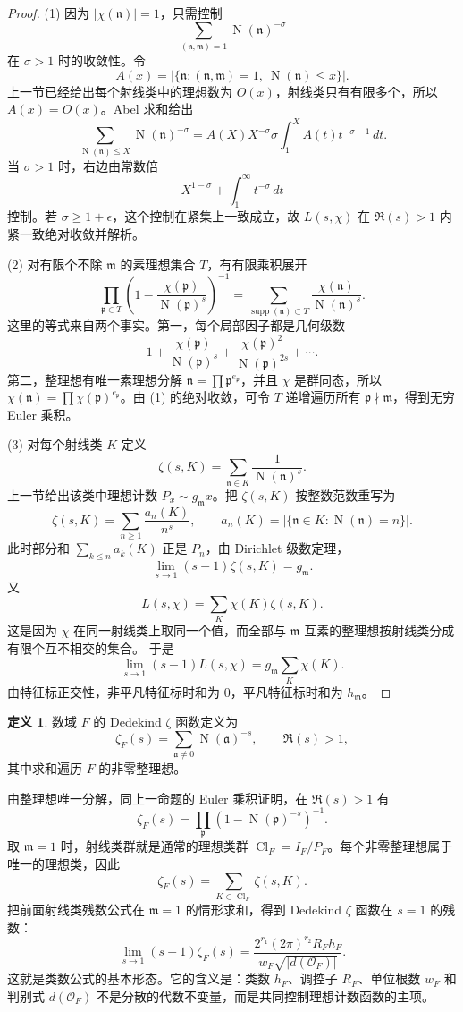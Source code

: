 \documentclass[11pt,a4paper,openany]{ctexbook}
\numberwithin{equation}{chapter}
\newcommand{\OF}{\mathcal{O}_F}
\newcommand{\Nm}{\operatorname{N}}
\theoremstyle{plain}
\theoremstyle{definition}
\newtheorem{definition}[theorem]{定义}
\theoremstyle{remark}
\begin{document}
\begin{proof}
(1) 因为 $|\chi(\mathfrak n)|=1$，只需控制
\[
\sum_{(\mathfrak n,\mathfrak m)=1}\Nm(\mathfrak n)^{-\sigma}
\]
在 $\sigma>1$ 时的收敛性。令
\[
A(x)=|\{\mathfrak n:(\mathfrak n,\mathfrak m)=1,\ \Nm(\mathfrak n)\le x\}|.
\]
上一节已经给出每个射线类中的理想数为 $O(x)$，射线类只有有限多个，所以
$A(x)=O(x)$。Abel 求和给出
\[
\sum_{\Nm(\mathfrak n)\le X}\Nm(\mathfrak n)^{-\sigma}
=A(X)X^{-\sigma}
 \sigma\int_1^X A(t)t^{-\sigma-1}\,dt .
\]
当 $\sigma>1$ 时，右边由常数倍
\[
X^{1-\sigma}+\int_1^\infty t^{-\sigma}\,dt
\]
控制。若 $\sigma\ge1+\epsilon$，这个控制在紧集上一致成立，故 $L(s,\chi)$ 在
$\Re(s)>1$ 内紧一致绝对收敛并解析。

(2) 对有限个不除 $\mathfrak m$ 的素理想集合 $T$，有有限乘积展开
\[
\prod_{\mathfrak p\in T}
\left(1-\frac{\chi(\mathfrak p)}{\Nm(\mathfrak p)^s}\right)^{-1}
=
\sum_{\operatorname{supp}(\mathfrak n)\subset T}
\frac{\chi(\mathfrak n)}{\Nm(\mathfrak n)^s}.
\]
这里的等式来自两个事实。第一，每个局部因子都是几何级数
\[
1+\frac{\chi(\mathfrak p)}{\Nm(\mathfrak p)^s}
+\frac{\chi(\mathfrak p)^2}{\Nm(\mathfrak p)^{2s}}+\cdots .
\]
第二，整理想有唯一素理想分解
\(\mathfrak n=\prod \mathfrak p^{e_{\mathfrak p}}\)，并且 $\chi$ 是群同态，所以
\(\chi(\mathfrak n)=\prod\chi(\mathfrak p)^{e_{\mathfrak p}}\)。由 (1) 的绝对收敛，可令
$T$ 递增遍历所有 $\mathfrak p\nmid\mathfrak m$，得到无穷 Euler 乘积。

(3) 对每个射线类 $K$ 定义
\[
\zeta(s,K)=\sum_{\mathfrak n\in K}\frac1{\Nm(\mathfrak n)^s}.
\]
上一节给出该类中理想计数 $P_x\sim g_{\mathfrak m}x$。把
$\zeta(s,K)$ 按整数范数重写为
\[
\zeta(s,K)=\sum_{n\ge1}\frac{a_n(K)}{n^s},\qquad
a_n(K)=|\{\mathfrak n\in K:\Nm(\mathfrak n)=n\}|.
\]
此时部分和 $\sum_{k\le n}a_k(K)$ 正是 $P_n$，由 Dirichlet 级数定理，
\[
\lim_{s\to1}(s-1)\zeta(s,K)=g_{\mathfrak m}.
\]
又
\[
L(s,\chi)=\sum_K\chi(K)\zeta(s,K).
\]
这是因为 $\chi$ 在同一射线类上取同一个值，而全部与 $\mathfrak m$ 互素的整理想按射线类分成有限个互不相交的集合。
于是
\[
\lim_{s\to1}(s-1)L(s,\chi)
=g_{\mathfrak m}\sum_K\chi(K).
\]
由特征标正交性，非平凡特征标时和为 $0$，平凡特征标时和为 $h_{\mathfrak m}$。
\end{proof}

\begin{definition}
数域 $F$ 的 Dedekind $\zeta$ 函数定义为
\[
\zeta_F(s)=\sum_{\mathfrak a\ne0}\Nm(\mathfrak a)^{-s},
\qquad \Re(s)>1,
\]
其中求和遍历 $F$ 的非零整理想。
\end{definition}

由整理想唯一分解，同上一命题的 Euler 乘积证明，在 $\Re(s)>1$ 有
\[
\zeta_F(s)=\prod_{\mathfrak p}(1-\Nm(\mathfrak p)^{-s})^{-1}.
\]
取 $\mathfrak m=1$ 时，射线类群就是通常的理想类群
$\operatorname{Cl}_F=I_F/P_F$。每个非零整理想属于唯一的理想类，因此
\[
\zeta_F(s)=\sum_{K\in\operatorname{Cl}_F}\zeta(s,K).
\]
把前面射线类残数公式在 $\mathfrak m=1$ 的情形求和，得到 Dedekind
$\zeta$ 函数在 $s=1$ 的残数：
\[
\lim_{s\to1}(s-1)\zeta_F(s)
=
\frac{2^{r_1}(2\pi)^{r_2}R_Fh_F}
{w_F\sqrt{|d(\OF)|}}.
\]
这就是类数公式的基本形态。它的含义是：类数 $h_F$、调控子 $R_F$、单位根数
$w_F$ 和判别式 $d(\OF)$ 不是分散的代数不变量，而是共同控制理想计数函数的主项。
\end{document}
